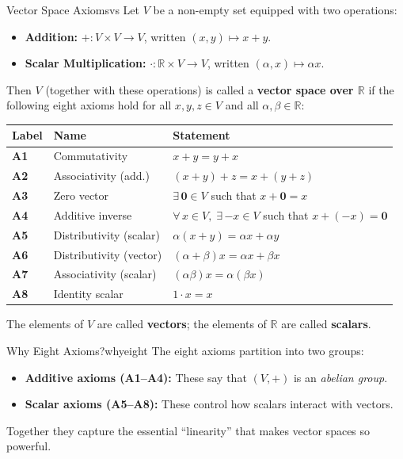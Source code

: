 \documentclass[12pt,a4paper]{article}
\newcommand{\R}{\mathbb{R}}
\newcommand{\vzero}{\mathbf{0}}
\begin{document}
\begin{axiombox}{Vector Space Axioms}{vs}
  Let $V$ be a non-empty set equipped with two operations:
  \begin{itemize}[leftmargin=2em]
    \item \textbf{Addition:} $+ : V\times V \to V$, written $(x,y)\mapsto x+y$.
    \item \textbf{Scalar Multiplication:} $\cdot : \R\times V \to V$,
          written $(\alpha, x)\mapsto \alpha x$.
  \end{itemize}
  Then $V$ (together with these operations) is called a \textbf{vector space over
  $\R$} if the following eight axioms hold for all $x,y,z\in V$ and all
  $\alpha,\beta\in\R$:

  \medskip
  \begin{tabular}{>{\bfseries}p{1.2cm} p{4.5cm} p{8cm}}
    \toprule
    Label & Name & Statement \\
    \midrule
    A1 & Commutativity &
      $x + y = y + x$ \\[4pt]
    A2 & Associativity (add.) &
      $(x + y) + z = x + (y + z)$ \\[4pt]
    A3 & Zero vector &
      $\exists\, \vzero \in V$ such that $x + \vzero = x$ \\[4pt]
    A4 & Additive inverse &
      $\forall\, x \in V,\; \exists\, {-x}\in V$ such that $x + (-x) = \vzero$ \\[4pt]
    A5 & Distributivity (scalar) &
      $\alpha(x + y) = \alpha x + \alpha y$ \\[4pt]
    A6 & Distributivity (vector) &
      $(\alpha + \beta)x = \alpha x + \beta x$ \\[4pt]
    A7 & Associativity (scalar) &
      $(\alpha\beta)x = \alpha(\beta x)$ \\[4pt]
    A8 & Identity scalar &
      $1\cdot x = x$ \\
    \bottomrule
  \end{tabular}

  \medskip\noindent
  The elements of $V$ are called \textbf{vectors}; the elements of $\R$ are called
  \textbf{scalars}.
\end{axiombox}

\begin{remark}{Why Eight Axioms?}{whyeight}
  The eight axioms partition into two groups:
  \begin{itemize}[leftmargin=2em]
    \item \textbf{Additive axioms (A1--A4):} These say that $(V,+)$ is an
          \emph{abelian group}.
    \item \textbf{Scalar axioms (A5--A8):} These control how scalars interact
          with vectors.
  \end{itemize}
  Together they capture the essential ``linearity'' that makes vector spaces
  so powerful.
\end{remark}
\end{document}
